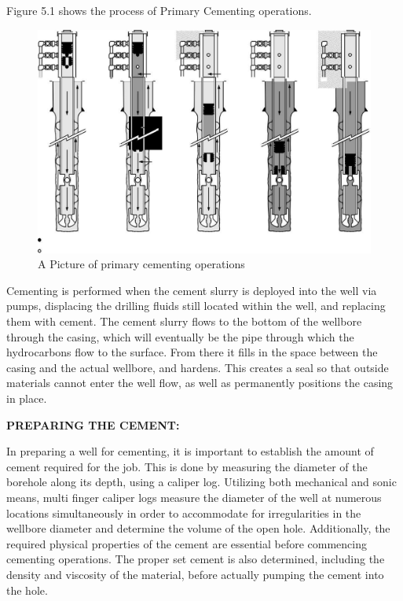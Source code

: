 Figure 5.1 shows the process of Primary Cementing operations.

\begin{figure}[h]
\includegraphics[scale=0.3]{images/primarycemtingoperation}
\centering 
\caption{A Picture of primary cementing operations}
\end{figure}

Cementing is performed when the cement slurry is deployed into the well via pumps,
displacing the drilling fluids still located within the well, and replacing them with cement.
The cement slurry flows to the bottom of the wellbore through the casing, 
which will eventually be the pipe through which the hydrocarbons flow to the surface. 
From there it fills in the space between the casing and the actual wellbore,
and hardens. This creates a seal so that outside materials cannot enter the well flow, as well as permanently positions the casing in place.

\vspace{1em}

\noindent \textbf{PREPARING THE CEMENT:}

\vspace{1em}

In preparing a well for cementing, it is important to establish the amount of cement required for the job.
This is done by measuring the diameter of the borehole along its depth, 
using a caliper log. Utilizing both mechanical and sonic means,
multi finger caliper logs measure the diameter of the well at numerous locations simultaneously in order to accommodate for irregularities in the wellbore diameter and determine the volume of the open hole.
Additionally, the required physical properties of the cement are essential before commencing 
cementing operations. The proper set cement is also determined, 
including the density and viscosity of the material, before actually pumping the cement into the hole.

